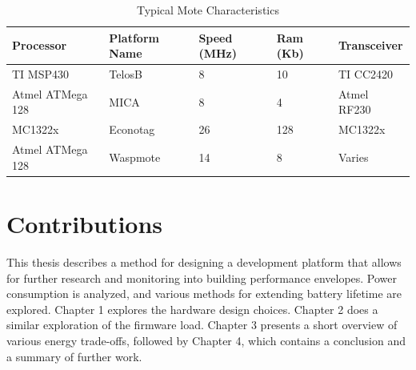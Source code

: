 \begin{table}[h]
\begin{tabular}{@{}lllll@{}}
\toprule
Processor & Platform Name & Speed (MHz) & Ram (Kb) & Transceiver \\ \midrule
TI MSP430 & TelosB & 8 & 10 & TI CC2420 \\
Atmel ATMega 128 & MICA & 8 & 4 & Atmel RF230 \\
MC1322x & Econotag & 26 & 128 & MC1322x \\
Atmel ATMega 128 & Waspmote & 14 & 8 & Varies \\ \bottomrule
\end{tabular}
\caption{Typical Mote Characteristics}
\label{mote_characteristics}
\end{table}

\section{Contributions}

This thesis describes a method for designing a development platform that allows for further research and monitoring into building performance envelopes. Power consumption is analyzed, and various methods for extending battery lifetime are explored. Chapter 1 explores the hardware design choices. Chapter 2 does a similar exploration of the firmware load. Chapter 3 presents a short overview of various energy trade-offs, followed by Chapter 4, which contains a conclusion and a summary of further work.